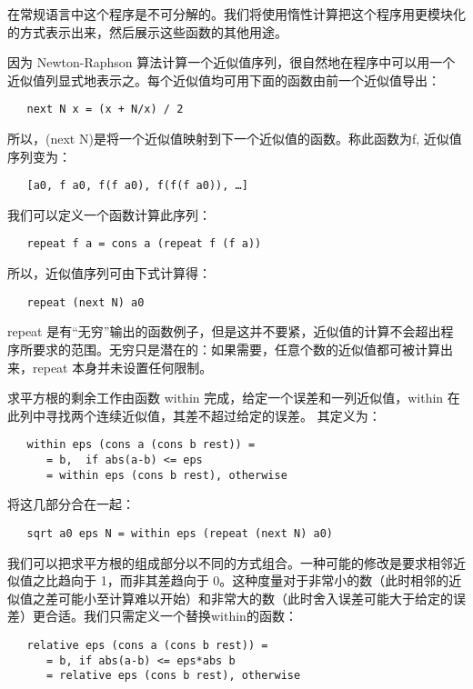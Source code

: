 \documentclass[12pt]{article}
\begin{document}
在常规语言中这个程序是不可分解的。我们将使用惰性计算把这个程序用更模块化的方式表示出来，然后展示这些函数的其他用途。

因为 Newton-Raphson 算法计算一个近似值序列，很自然地在程序中可以用一个近似值列显式地表示之。每个近似值均可用下面的函数由前一个近似值导出：

\begin{verbatim}
   next N x = (x + N/x) / 2
\end{verbatim}

所以，(next N)是将一个近似值映射到下一个近似值的函数。称此函数为f, 近似值序列变为：

\begin{verbatim}
   [a0, f a0, f(f a0), f(f(f a0)), …]
\end{verbatim}

我们可以定义一个函数计算此序列：

\begin{verbatim}
   repeat f a = cons a (repeat f (f a))
\end{verbatim}

所以，近似值序列可由下式计算得：

\begin{verbatim}
   repeat (next N) a0
\end{verbatim}

repeat 是有``无穷''输出的函数例子，但是这并不要紧，近似值的计算不会超出程序所要求的范围。无穷只是潜在的：如果需要，任意个数的近似值都可被计算出来，repeat 本身并未设置任何限制。

求平方根的剩余工作由函数 within 完成，给定一个误差和一列近似值，within 在此列中寻找两个连续近似值，其差不超过给定的误差。 其定义为：

\begin{verbatim}
   within eps (cons a (cons b rest)) =
      = b,  if abs(a-b) <= eps
      = within eps (cons b rest), otherwise
\end{verbatim}

将这几部分合在一起：

\begin{verbatim}
   sqrt a0 eps N = within eps (repeat (next N) a0)
\end{verbatim}

我们可以把求平方根的组成部分以不同的方式组合。一种可能的修改是要求相邻近似值之比趋向于 1，而非其差趋向于 0。这种度量对于非常小的数（此时相邻的近似值之差可能小至计算难以开始）和非常大的数（此时舍入误差可能大于给定的误差）更合适。我们只需定义一个替换within的函数：

\begin{verbatim}
   relative eps (cons a (cons b rest)) =
      = b, if abs(a-b) <= eps*abs b
      = relative eps (cons b rest), otherwise
\end{verbatim}
\end{document}
